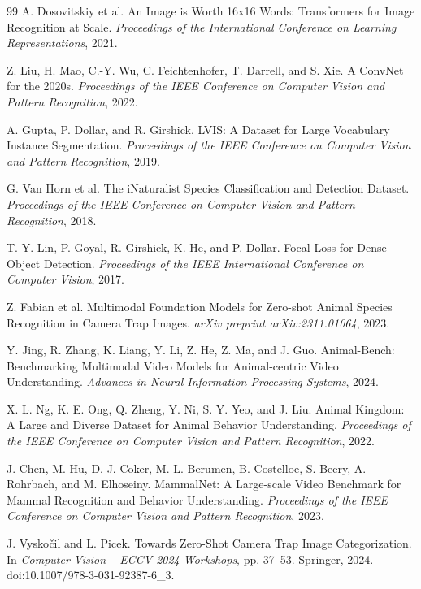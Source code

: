 \documentclass{article}
\begin{document}
\begin{thebibliography}{99}
A. Dosovitskiy et al.
An Image is Worth 16x16 Words: Transformers for Image Recognition at Scale.
\emph{Proceedings of the International Conference on Learning Representations}, 2021.

Z. Liu, H. Mao, C.-Y. Wu, C. Feichtenhofer, T. Darrell, and S. Xie.
A ConvNet for the 2020s.
\emph{Proceedings of the IEEE Conference on Computer Vision and Pattern Recognition}, 2022.

A. Gupta, P. Dollar, and R. Girshick.
LVIS: A Dataset for Large Vocabulary Instance Segmentation.
\emph{Proceedings of the IEEE Conference on Computer Vision and Pattern Recognition}, 2019.

G. Van Horn et al.
The iNaturalist Species Classification and Detection Dataset.
\emph{Proceedings of the IEEE Conference on Computer Vision and Pattern Recognition}, 2018.

T.-Y. Lin, P. Goyal, R. Girshick, K. He, and P. Dollar.
Focal Loss for Dense Object Detection.
\emph{Proceedings of the IEEE International Conference on Computer Vision}, 2017.

Z. Fabian et al.
Multimodal Foundation Models for Zero-shot Animal Species Recognition in Camera Trap Images.
\emph{arXiv preprint arXiv:2311.01064}, 2023.

Y. Jing, R. Zhang, K. Liang, Y. Li, Z. He, Z. Ma, and J. Guo.
Animal-Bench: Benchmarking Multimodal Video Models for Animal-centric Video Understanding.
\emph{Advances in Neural Information Processing Systems}, 2024.

X. L. Ng, K. E. Ong, Q. Zheng, Y. Ni, S. Y. Yeo, and J. Liu.
Animal Kingdom: A Large and Diverse Dataset for Animal Behavior Understanding.
\emph{Proceedings of the IEEE Conference on Computer Vision and Pattern Recognition}, 2022.

J. Chen, M. Hu, D. J. Coker, M. L. Berumen, B. Costelloe, S. Beery, A. Rohrbach, and M. Elhoseiny.
MammalNet: A Large-scale Video Benchmark for Mammal Recognition and Behavior Understanding.
\emph{Proceedings of the IEEE Conference on Computer Vision and Pattern Recognition}, 2023.

J. Vysko{\v{c}}il and L. Picek.
Towards Zero-Shot Camera Trap Image Categorization.
In \emph{Computer Vision -- ECCV 2024 Workshops}, pp. 37--53. Springer, 2024.
doi:10.1007/978-3-031-92387-6\_3.


\end{thebibliography}
\end{document}
